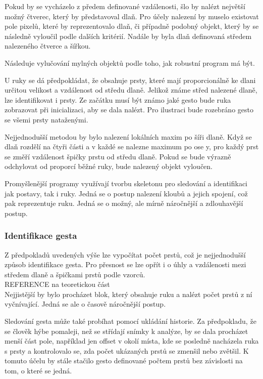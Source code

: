 Pokud by se vycházelo z předem definované vzdálenosti, šlo by nalézt největší možný čtverec, který by představoval dlaň. Pro účely nalezení by muselo existovat pole pixelů, které by reprezentovalo dlaň, či případně podobný objekt, který by se následně vyloučil podle dalších kritérií. Nadále by byla dlaň definovaná středem nalezeného čtverce a šířkou.

Následuje vylučování mylných objektů podle toho, jak robustní program má být.

U ruky se dá předpokládat, že obsahuje prsty, které mají proporcionálně ke dlani určitou velikost a vzdálenost od středu dlaně. Jelikož známe střed nalezené dlaně, lze identifikovat i prsty. Ze začátku musí být známo jaké gesto bude ruka zobrazovat při inicializaci, aby se dala nalézt. Pro ilustraci bude rozebráno gesto se všemi prsty nataženými. 

Nejjednodušší metodou by bylo nalezení lokálních maxim po šíři dlaně. Když se dlaň rozdělí na čtyři části a v každé se nalezne maximum po ose y, pro každý prst se změří vzdálenost špičky prstu od středu dlaně. Pokud se bude výrazně odchylovat od proporcí běžné ruky, bude nalezený objekt vyloučen.

Promyšlenější programy využívají tvorbu skeletonu pro sledování a identifikaci jak postavy, tak i ruky. Jedná se o postup nalezení kloubů a jejich spojení, což pak reprezentuje ruku. Jedná se o možný, ale mírně náročnější a zdlouhavější postup.


\subsubsection{Identifikace gesta}
Z předpokladů uvedených výše lze vypočítat počet prstů, což je nejjednodušší způsob identifikace gesta. Pro přesnost se lze opřít i o úhly a vzdálenosti mezi středem dlaně a špičkami prstů podle vzorců.\\
REFERENCE na teoretickou část \\
Nejjistější by bylo procházet blok, který obsahuje ruku a nalézt počet prstů z ní vyčnívající. Jedná se ale o časově náročnější postup.

Sledování gesta může také probíhat pomocí ukládání historie. Za předpokladu, že se člověk hýbe pomaleji, než se střídají snímky k analýze, by se dala procházet menší část pole, například jen offset v okolí místa, kde se posledně nacházela ruka s prsty a kontrolovalo se, zda počet ukázaných prstů se zmenšil nebo zvětšil. K tomuto účelu by stále stačilo gesto definované počtem prstů bez závislosti na tom, o které se jedná.

